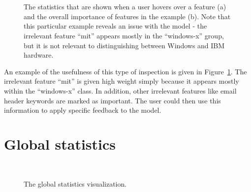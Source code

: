 \documentclass{chi2009}
\begin{document}
\begin{figure}
  \\
  \centering
  \\
  \caption{The statistics that are shown when a user hovers over a feature (a)
    and the overall importance of features in the example (b). Note
    that this particular example reveals an issue with the model - the irrelevant
    feature ``mit'' appears mostly in the ``windows-x'' group, but it is not
    relevant to distinguishing between Windows and IBM hardware.}
  \label{fig:feature_explain}
\end{figure}

An example of the usefulness of this type of inspection is given in
Figure~\ref{fig:feature_explain}. The irrelevant feature ``mit'' is given high
weight simply because it appears mostly within the ``windows-x'' class. In
addition, other irrelevant features like email header keywords are marked as
important. The user could then use this information to apply specific feedback
to the model.

\section{Global statistics}
\begin{figure}
  \\
  \caption{The global statistics visualization.}
  \label{fig:statistics}
\end{figure}
\end{document}

